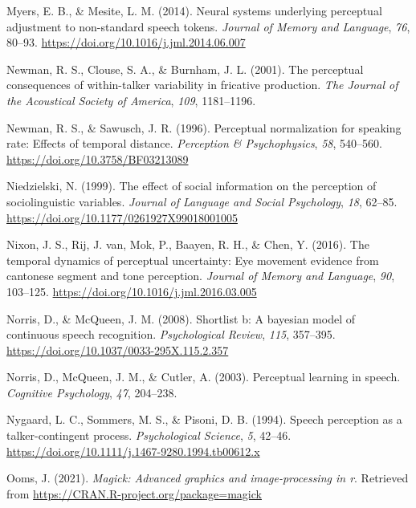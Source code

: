 \documentclass[
  11pt,
  english,
  man,floatsintext]{apa6}
\newlength{\cslhangindent}
\newlength{\cslentryspacingunit} %
\newenvironment{CSLReferences}[2] %
 {%
  \setlength{\parindent}{0pt}
  \ifodd #1
  \let\oldpar\par
  \def\par{\hangindent=\cslhangindent\oldpar}
  \fi
  \setlength{\parskip}{#2\cslentryspacingunit}
 }%
 {}
\begin{document}
\begin{CSLReferences}{1}{0}
\leavevmode{}%
Myers, E. B., \& Mesite, L. M. (2014). Neural systems underlying perceptual adjustment to non-standard speech tokens. \emph{Journal of Memory and Language}, \emph{76}, 80--93. \url{https://doi.org/10.1016/j.jml.2014.06.007}

\leavevmode{}%
Newman, R. S., Clouse, S. A., \& Burnham, J. L. (2001). The perceptual consequences of within-talker variability in fricative production. \emph{The Journal of the Acoustical Society of America}, \emph{109}, 1181--1196.

\leavevmode{}%
Newman, R. S., \& Sawusch, J. R. (1996). Perceptual normalization for speaking rate: Effects of temporal distance. \emph{Perception \& Psychophysics}, \emph{58}, 540--560. \url{https://doi.org/10.3758/BF03213089}

\leavevmode{}%
Niedzielski, N. (1999). The effect of social information on the perception of sociolinguistic variables. \emph{Journal of Language and Social Psychology}, \emph{18}, 62--85. \url{https://doi.org/10.1177/0261927X99018001005}

\leavevmode{}%
Nixon, J. S., Rij, J. van, Mok, P., Baayen, R. H., \& Chen, Y. (2016). The temporal dynamics of perceptual uncertainty: Eye movement evidence from cantonese segment and tone perception. \emph{Journal of Memory and Language}, \emph{90}, 103--125. \url{https://doi.org/10.1016/j.jml.2016.03.005}

\leavevmode{}%
Norris, D., \& McQueen, J. M. (2008). Shortlist b: A bayesian model of continuous speech recognition. \emph{Psychological Review}, \emph{115}, 357--395. \url{https://doi.org/10.1037/0033-295X.115.2.357}

\leavevmode{}%
Norris, D., McQueen, J. M., \& Cutler, A. (2003). Perceptual learning in speech. \emph{Cognitive Psychology}, \emph{47}, 204--238.

\leavevmode{}%
Nygaard, L. C., Sommers, M. S., \& Pisoni, D. B. (1994). Speech perception as a talker-contingent process. \emph{Psychological Science}, \emph{5}, 42--46. \url{https://doi.org/10.1111/j.1467-9280.1994.tb00612.x}

\leavevmode{}%
Ooms, J. (2021). \emph{Magick: Advanced graphics and image-processing in r}. Retrieved from \url{https://CRAN.R-project.org/package=magick}


\end{CSLReferences}
\end{document}
